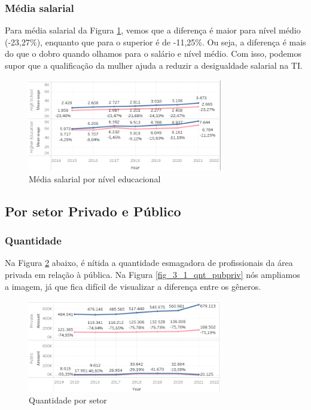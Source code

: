 \subsubsection{Média salarial}

Para média salarial da Figura \ref{fig_2_sal_educ}, vemos que a diferença é maior para nível médio (-23,27\%), enquanto que para o superior é de -11,25\%. Ou seja, a diferença é mais do que o dobro quando olhamos para o salário e nível médio. Com isso, podemos supor que a qualificação da mulher ajuda a reduzir a desigualdade salarial na TI.

\begin{figure}[htbp]
	\centerline{
		\includegraphics[width=85mm]{assets/2_sal_educ.PNG}
	}
	\caption{Média salarial por nível educacional}
	\label{fig_2_sal_educ}
\end{figure}

\subsection{Por setor Privado e Público}  \label{sub:privpub}

\subsubsection{Quantidade}

Na Figura \ref{fig_3_qnt_pubpriv} abaixo, é nítida a quantidade esmagadora de profissionais da área privada em relação à pública. Na Figura  \ref{fig_3_1_qnt_pubpriv} nós ampliamos a imagem, já que fica difícil de visualizar a diferença entre os gêneros.

\begin{figure}[htbp]
	\centerline{
		\includegraphics[width=85mm]{assets/3_qnt_pubpriv.PNG}
	}
	\caption{Quantidade por setor}
	\label{fig_3_qnt_pubpriv}
\end{figure}


